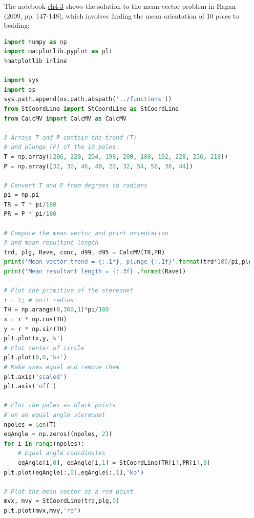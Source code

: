 \documentclass[a4paper , 12pt]{book}
\begin{document}
The notebook \href{https://github.com/nfcd/compGeo/blob/master/source/notebooks/ch4-3.ipynb}{ch4-3} shows the solution to the mean vector problem in Ragan (2009, pp. 147-148), which involves finding the mean orientation of 10 poles to bedding:

\begin{center}
\begin{lstlisting}[language=Python, frame=single]
import numpy as np
import matplotlib.pyplot as plt
%matplotlib inline

import sys
import os
sys.path.append(os.path.abspath('../functions'))
from StCoordLine import StCoordLine as StCoordLine
from CalcMV import CalcMV as CalcMV 

# Arrays T and P contain the trend (T) 
# and plunge (P) of the 10 poles
T = np.array([206, 220, 204, 198, 200, 188, 192, 228, 236, 218])
P = np.array([32, 30, 46, 40, 20, 32, 54, 56, 36, 44])

# Convert T and P from degrees to radians
pi = np.pi
TR = T * pi/180
PR = P * pi/180

# Compute the mean vector and print orientation
# and mean resultant length
trd, plg, Rave, conc, d99, d95 = CalcMV(TR,PR)
print('Mean vector trend = {:.1f}, plunge {:.1f}'.format(trd*180/pi,plg*180/pi))
print('Mean resultant length = {:.3f}'.format(Rave))

# Plot the primitive of the stereonet
r = 1; # unit radius
TH = np.arange(0,360,1)*pi/180
x = r * np.cos(TH)
y = r * np.sin(TH)
plt.plot(x,y,'k')
# Plot center of circle
plt.plot(0,0,'k+')
# Make axes equal and remove them
plt.axis('scaled')
plt.axis('off')

# Plot the poles as black points
# on an equal angle stereonet
npoles = len(T)
eqAngle = np.zeros((npoles, 2))
for i in range(npoles):
    # Equal angle coordinates
    eqAngle[i,0], eqAngle[i,1] = StCoordLine(TR[i],PR[i],0)
plt.plot(eqAngle[:,0],eqAngle[:,1],'ko')

# Plot the mean vector as a red point
mvx, mvy = StCoordLine(trd,plg,0)
plt.plot(mvx,mvy,'ro')
\end{lstlisting}
\end{center}
\end{document}

